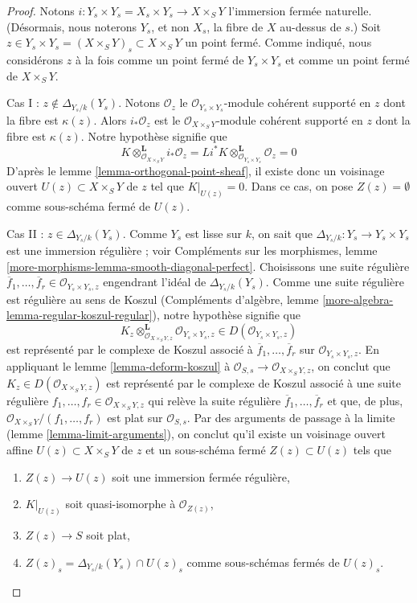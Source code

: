 \begin{proof}
Notons $i : Y_s \times Y_s = X_s \times Y_s \to X \times_S Y$
l'immersion fermée naturelle. (Désormais, nous noterons $Y_s$, et non $X_s$,
la fibre de $X$ au-dessus de $s$.) Soit
$z \in Y_s \times Y_s = (X \times_S Y)_s \subset X \times_S Y$
un point fermé. Comme indiqué, nous considérons $z$ à la fois comme un point fermé
de $Y_s \times Y_s$ et comme un point fermé de $X \times_S Y$.

\medskip\noindent
Cas I : $z \not \in \Delta_{Y_s/k}(Y_s)$. Notons $\mathcal{O}_z$
le $\mathcal{O}_{Y_s \times Y_s}$-module cohérent supporté en $z$
dont la fibre est $\kappa(z)$. Alors $i_*\mathcal{O}_z$ est le
$\mathcal{O}_{X \times_S Y}$-module cohérent supporté en $z$
dont la fibre est $\kappa(z)$. Notre hypothèse signifie que
$$
K \otimes_{\mathcal{O}_{X \times_S Y}}^\mathbf{L} i_*\mathcal{O}_z =
Li^*K \otimes_{\mathcal{O}_{Y_s \times Y_s}}^\mathbf{L} \mathcal{O}_z = 0
$$
D'après le lemme \ref{lemma-orthogonal-point-sheaf}, il existe donc
un voisinage ouvert $U(z) \subset X \times_S Y$ de $z$
tel que $K|_{U(z)} = 0$. Dans ce cas, on pose $Z(z) = \emptyset$
comme sous-schéma fermé de $U(z)$.

\medskip\noindent
Cas II : $z \in \Delta_{Y_s/k}(Y_s)$. Comme $Y_s$ est lisse sur $k$,
on sait que $\Delta_{Y_s/k} : Y_s \to Y_s \times Y_s$ est une
immersion régulière ; voir Compléments sur les morphismes, lemme
\ref{more-morphisms-lemma-smooth-diagonal-perfect}.
Choisissons une suite régulière $\overline{f}_1, \ldots, \overline{f}_r \in
\mathcal{O}_{Y_s \times Y_s, z}$ engendrant l'idéal de
$\Delta_{Y_s/k}(Y_s)$. Comme une suite régulière est régulière au sens de Koszul
(Compléments d'algèbre, lemme \ref{more-algebra-lemma-regular-koszul-regular}),
notre hypothèse signifie que
$$
K_z \otimes_{\mathcal{O}_{X \times_S Y, z}}^\mathbf{L}
\mathcal{O}_{Y_s \times Y_s, z}
\in D(\mathcal{O}_{Y_s \times Y_s, z})
$$
est représenté par le complexe de Koszul associé à
$\overline{f}_1, \ldots, \overline{f}_r$ sur
$\mathcal{O}_{Y_s \times Y_s, z}$.
En appliquant le lemme \ref{lemma-deform-koszul} à
$\mathcal{O}_{S, s} \to \mathcal{O}_{X \times_S Y, z}$,
on conclut que $K_z \in D(\mathcal{O}_{X \times_S Y, z})$ est
représenté par le complexe de Koszul associé à une suite régulière
$f_1, \ldots, f_r \in \mathcal{O}_{X \times_S Y, z}$
qui relève la suite régulière
$\overline{f}_1, \ldots, \overline{f}_r$
et que, de plus, $\mathcal{O}_{X \times_S Y}/(f_1, \ldots, f_r)$
est plat sur $\mathcal{O}_{S, s}$.
Par des arguments de passage à la limite (lemme \ref{lemma-limit-arguments}),
on conclut qu'il existe un voisinage ouvert affine
$U(z) \subset X \times_S Y$ de $z$ et un sous-schéma fermé
$Z(z) \subset U(z)$ tels que
\begin{enumerate}
\item $Z(z) \to U(z)$ soit une immersion fermée régulière,
\item $K|_{U(z)}$ soit quasi-isomorphe à $\mathcal{O}_{Z(z)}$,
\item $Z(z) \to S$ soit plat,
\item $Z(z)_s = \Delta_{Y_s/k}(Y_s) \cap U(z)_s$
comme sous-schémas fermés de $U(z)_s$.
\end{enumerate}


\end{proof}
